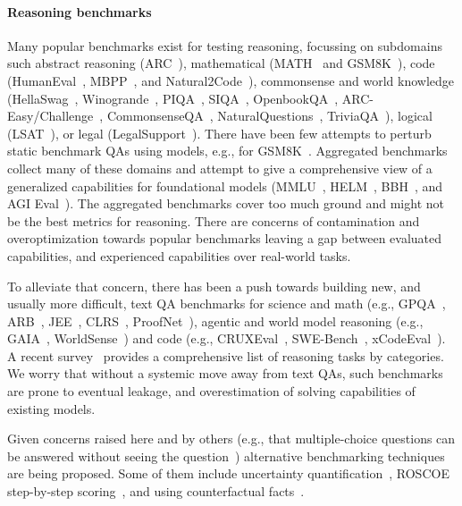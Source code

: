 \documentclass[11pt,a4paper]{article}
\begin{document}
\paragraph{Reasoning benchmarks}
Many popular benchmarks exist for testing reasoning, focussing on subdomains
such
abstract reasoning (ARC~\cite{cholet-arc}),
mathematical (MATH~\cite{math} and GSM8K~\cite{gsm8k}),
code (HumanEval~\cite{humaneval}, MBPP~\cite{mbpp}, and Natural2Code~\cite{gemini}),
commonsense and world knowledge
(HellaSwag~\cite{hellaswag},
Winogrande~\cite{winogrande}, PIQA~\cite{piqa}, SIQA~\cite{siqa},
OpenbookQA~\cite{openbookqa}, ARC-Easy/Challenge~\cite{arc-easy-challenge},
CommonsenseQA~\cite{commonsenseQA},
NaturalQuestions~\cite{naturalquestions}, TriviaQA~\cite{triviaQA}),
logical (LSAT~\cite{lsat}),
or legal (LegalSupport~\cite{helm}).
There have been few attempts to perturb static benchmark QAs using models, e.g.,
for GSM8K~\cite{gsmplus}.
Aggregated benchmarks collect many of these domains and attempt to give
a comprehensive view of a generalized capabilities for foundational models
(MMLU~\cite{mmlu},
HELM~\cite{helm}, BBH~\cite{big-bench-hard}, and AGI Eval~\cite{agi-eval}).
The aggregated benchmarks cover too much ground and might not be the best
metrics for reasoning.
There are concerns of contamination and overoptimization towards popular
benchmarks leaving a gap between evaluated capabilities, and experienced
capabilities over real-world tasks.

To alleviate that concern, there has been a push towards building new, and
usually more difficult, text QA benchmarks for science and math (e.g.,
GPQA~\cite{gpqa}, ARB~\cite{arb}, JEE~\cite{jee}, CLRS~\cite{clrs}, ProofNet~\cite{proofnet}), agentic and world model reasoning (e.g.,
GAIA~\cite{gaia}, WorldSense~\cite{worldsense}) and code (e.g.,
CRUXEval~\cite{cruxeval}, SWE-Bench~\cite{swe-bench}, xCodeEval~\cite{xcodeeval}).
A recent survey~\cite{survey-reasoning} provides a comprehensive list of
reasoning tasks by categories.
We worry that without a
systemic move away from text QAs, such benchmarks are prone to eventual
leakage, and overestimation of solving capabilities of existing models.

Given concerns raised here and by others (e.g., that
multiple-choice questions can be answered without seeing the
question~\cite{mcq-without-questions}) alternative benchmarking techniques are
being proposed. Some of them include uncertainty
quantification~\cite{uncertainity-quant}, ROSCOE step-by-step
scoring~\cite{roscoe}, and using counterfactual facts~\cite{counterfactual}.
\end{document}
